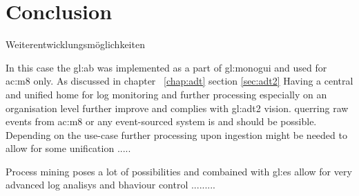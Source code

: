%
\chapter{Conclusion}

Weiterentwicklungsmöglichkeiten

In this case the \gls{gl:ab} was implemented as a part of \gls{gl:monogui} and used for \gls{ac:m8} only. As discussed in chapter ~\ref{chap:adt} section \ref{sec:adt2} Having a central and unified home for log monitoring and further processing especially on an organisation level further improve and complies with \gls{gl:adt2} vision. querring raw events from \gls{ac:m8} or any event-sourced system is and should be possible. Depending on the use-case further processing upon ingestion might be needed to allow for some unification .....


Process mining poses a lot of possibilities and combained with \gls{gl:es} allow for very advanced log analisys and bhaviour control .........